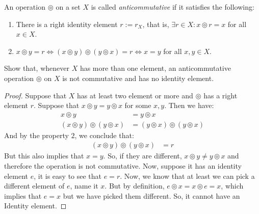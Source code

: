 \documentclass{tufte-handout}
\begin{document}
\begin{problem}
	An operation $\circledcirc$ on a set $X$ is called \textit{anticommutative} if it satisfies the following:
	\begin{enumerate}
		\item There is a right identity element $r := r_X$, that is, $\exists r \in X: x \circledcirc r = x$ for all $x \in X$.
		\item $x \circledcirc y = r \Leftrightarrow (x \circledcirc y) \circledcirc (y \circledcirc x) = r \Leftrightarrow x = y$ for all $x, y \in X$.
	\end{enumerate}
	Show that, whenever $X$ has more than one element, an anticommutative operation $\circledcirc$ on $X$ is not commutative and has no identity element.
\end{problem}
\begin{proof}
	Suppose that $X$ has at least two element or more and $\circledcirc$ has a right element $r$. Suppose that $x \circledcirc y = y \circledcirc x$ for some $x, y$. Then we have:
	\begin{align*}
		x \circledcirc y &= y \circledcirc x\\
		(x \circledcirc y) \circledcirc (y \circledcirc x) &= (y \circledcirc x) \circledcirc (y \circledcirc x)
	\end{align*}
	And by the property $2$, we conclude that:
	\begin{align*}
		(x \circledcirc y) \circledcirc (y \circledcirc x) &= r
	\end{align*}
	But this also implies that $x = y$. So, if they are different, $x \circledcirc y \neq y \circledcirc x$ and therefore the operation is not commutative. Now, suppose it has an identity element $e$, it is easy to see that $e = r$. Now, we know that at least we can pick a different element of $e$, name it $x$. But by definition, $e \circledcirc x = x \circledcirc e = x$, which implies that $e = x$ but we have picked them different. So, it cannot have an Identity element. 
\end{proof}
\end{document}
